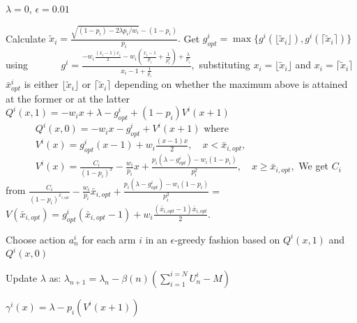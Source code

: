 \documentclass[12pt]{article}
\numberwithin{equation}{section}
\newcommand{\1}{\textbf{1}}
\begin{document}
\begin{algorithm}[H]
\caption{Algorithm for Restart Problem}
\label{tab:restart}
\begin{algorithmic}[1]
     $\lambda=0$, $\epsilon=0.01$

        \State Calculate $
\tilde{x}_i = \frac{\sqrt{(1-p_i)-2\lambda p_i/w_i}-(1-p_i)}{p_i}.
$
        \State Get $g^i_{opt} = \max \{ g^i(\lfloor \tilde{x}_i \rfloor), g^i(\lceil\tilde{x}_i\rceil) \}$ using
        \Statex $
\;\;\;\;\;\;\;\;\;\;\;g^i =
\frac{-w_i \frac{(x_i-1)x_i}{2} - w_i \left( \frac{x_i-1}{p_i}+\frac{1}{p_i^2} \right) 
+ \frac{\lambda}{p_i}}{x_i - 1 + \frac{1}{p_i}},
$ substituting $x_i=\lfloor \tilde{x}_i \rfloor$ and 
\Statex \;\;\;\;\;\;\;\;\;\;\; $x_i=\lceil\tilde{x}_i\rceil $
\State $\bar{x}^i_{opt}$ is either $\lfloor \tilde{x}_i \rfloor$ or $\lceil\tilde{x}_i\rceil$ depending on whether the maximum
\Statex \;\;\;\;\;\;\;\;\;\;\;above is attained at the former or at the latter
\State $Q^i(x,1)=-w_i x + \lambda - g^i_{opt} +  (1-p_i) V^i(x+1)$
\Statex$\;\;\;\;\;\;\;\;\;\;\;Q^i(x,0)=-w_i x - g^i_{opt} + V^i(x+1)$ where 
\Statex$\;\;\;\;\;\;\;\;\;\;\;
V^i(x) = g^i_{opt} (x-1) + w_i \frac{(x-1)x}{2}, \quad x < \bar{x}_{i,opt},
$
\Statex$\;\;\;\;\;\;\;\;\;\;\;
V^i(x) = \frac{C_i}{(1-p_i)^x} -\frac{w_i}{p_i}x +\frac{p_i(\lambda-g^i_{opt})-w_i(1-p_i)}{p_i^2},
\quad x \ge \bar{x}_{i,opt},
$
    \State We get $C_i$ from $
 \frac{C_i}{(1-p_i)^{\bar{x}_{i,opt}}} -\frac{w_i}{p_i}{\bar{x}_{i,opt}}+\frac{p_i(\lambda-g^i_{opt})-w_i(1-p_i)}{p_i^2} = $ 
 \Statex \;\;\;\;\;\;\;\;\;\;\;$V(\bar{x}_{i,opt}) =g^i_{opt} (\bar{x}_{i,opt}-1) + w_i \frac{(\bar{x}_{i,opt}-1)\bar{x}_{i,opt}}{2}.
$

        
            \State Choose action $a_{n}^i$ for each arm $i$ in an $\epsilon$-greedy fashion
            based on
            \Statex \;\;\;\;\;\;\;\;\;\;\;$Q^i(x,1)$ and $Q^i(x,0)$
        \EndFor
       
        \State Update $\lambda$ as: $\lambda_{n+1}=\lambda_n-\beta(n)\left(\sum\limits_{i=1}^{i=N}U_n^i-M\right)$
        
       
        
    \EndFor
   \State $
\gamma^i(x) = \lambda - p_i\left(V^i(x+1)\right)
$
\end{algorithmic}
\end{algorithm}
\end{document}
